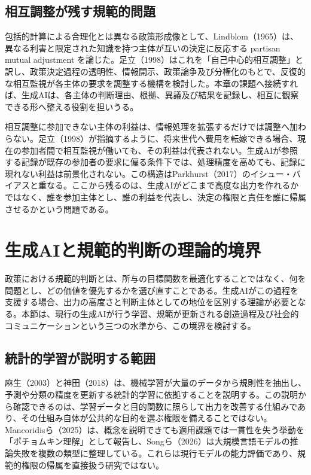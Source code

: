\subsection{相互調整が残す規範的問題}

包括的計算による合理化とは異なる政策形成像として、Lindblom（1965）は、異なる利害と限定された知識を持つ主体が互いの決定に反応する partisan mutual adjustment を論じた\cite{lindblom1965intelligence}。足立（1998）はこれを「自己中心的相互調整」と訳し、政策決定過程の透明性、情報開示、政策論争及び分権化のもとで、反復的な相互監視が各主体の要求を調整する機構を検討した\cite{adachi1998inefficiency}。本章の課題へ接続すれば、生成AIは、各主体の判断理由、根拠、異議及び結果を記録し、相互に観察できる形へ整える役割を担いうる。

相互調整に参加できない主体の利益は、情報処理を拡張するだけでは調整へ加わらない。足立（1998）が指摘するように、将来世代へ費用を転嫁できる場合、現在の参加者間で相互監視が働いても、その利益は代表されない\cite{adachi1998inefficiency}。生成AIが参照する記録が既存の参加者の要求に偏る条件下では、処理精度を高めても、記録に現れない利益は前景化されない。この構造はParkhurst（2017）のイシュー・バイアスと重なる\cite{parkhurst2017politics}。ここから残るのは、生成AIがどこまで高度な出力を作れるかではなく、誰を参加主体とし、誰の利益を代表し、決定の権限と責任を誰に帰属させるかという問題である。

\section{生成AIと規範的判断の理論的境界}

政策における規範的判断とは、所与の目標関数を最適化することではなく、何を問題とし、どの価値を優先するかを選び直すことである。生成AIがこの過程を支援する場合、出力の高度さと判断主体としての地位を区別する理論が必要となる。本節は、現行の生成AIが行う学習、規範が更新される創造過程及び社会的コミュニケーションという三つの水準から、この境界を検討する。

\subsection{統計的学習が説明する範囲}

麻生（2003）と神田（2018）は、機械学習が大量のデータから規則性を抽出し、予測や分類の精度を更新する統計的学習に依拠することを説明する\cite{asou2003,kanda2018}。この説明から確認できるのは、学習データと目的関数に照らして出力を改善する仕組みであり、その仕組み自体が公共的な目的を選ぶ権限を備えることではない。Mancoridisら（2025）は、概念を説明できても適用課題では一貫性を失う挙動を「ポチョムキン理解」として報告し\cite{mancoridis2025potemkin}、Songら（2026）は大規模言語モデルの推論失敗を複数の類型に整理している\cite{song2026reasoning}。これらは現行モデルの能力評価であり、規範的権限の帰属を直接扱う研究ではない。

